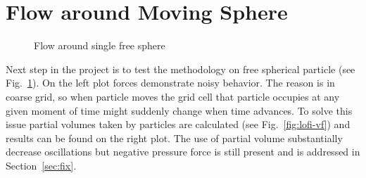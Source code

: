 \section{Flow around Moving Sphere}
\begin{figure}[h!]
\begin{minipage}{0.5\linewidth}
\end{minipage}
\begin{minipage}{0.5\linewidth}
\end{minipage}
\caption{Flow around single free sphere} \label{fig:lofi_single_vf}
\end{figure}
Next step in the project is to test the methodology on free spherical particle (see Fig.~\ref{fig:lofi_single_vf}). On the left plot forces demonstrate noisy behavior. The reason is in coarse grid, so when particle moves the grid cell that particle occupies at any given moment of time might suddenly change when time advances. To solve this issue partial volumes taken by particles are calculated (see Fig.~\ref{fig:lofi-vf}) and results can be found on the right plot. The use of partial volume substantially decrease oscillations but negative pressure force is still present and is addressed in Section~\ref{sec:fix}.
